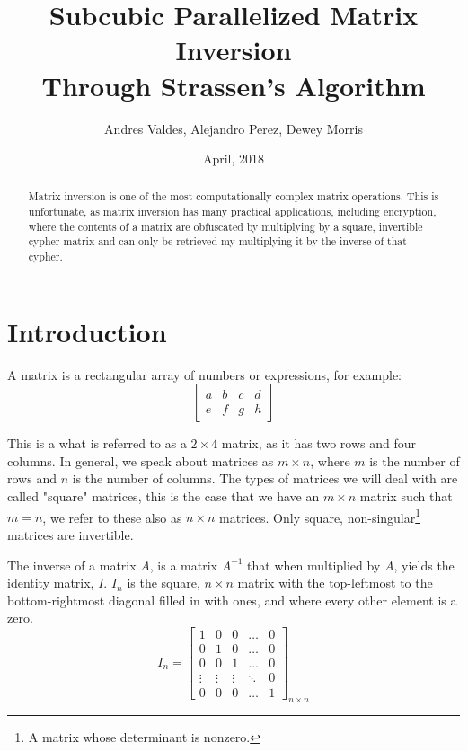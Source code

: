 \documentclass[12pt, letterpaper]{article}
\title{Subcubic Parallelized Matrix Inversion \\
	\large Through Strassen's Algorithm}
\author{Andres Valdes, Alejandro Perez, Dewey Morris}
\date{April, 2018}
\theoremstyle{remark}
\theoremstyle{remark}
\begin{document}
    \begin{titlepage}
        \maketitle
        \thispagestyle{empty}

    \end{titlepage}

    \begin{abstract}
        
        Matrix inversion is one of the most computationally complex 
        matrix operations. This is unfortunate, as matrix inversion 
        has many practical applications, including encryption, where the 
        contents of a matrix are obfuscated by multiplying by a square,
        invertible cypher matrix and can only be retrieved my multiplying
        it by the inverse of that cypher.

    \end{abstract}

    \pagebreak

    \section{Introduction}

    \noindent 
    A matrix is a rectangular array of numbers or expressions, for example: 
    \[\begin{bmatrix*}
        a & b & c & d \\
        e & f & g & h
    \end{bmatrix*}\]

    This is a what is referred to as a \(2\times{4}\) matrix, as it 
    has two rows and four columns. In general, we speak about matrices as 
    \(m\times{n}\), where \(m\) is the number of rows and \(n\) is the number 
    of columns. The types of matrices we will deal with are called "square" 
    matrices, this is the case that we have an \(m\times{n}\) matrix such that 
    \(m = n\), we refer to these also as \(n\times{n}\) matrices. Only square, 
    non-singular\footnote{A matrix whose determinant is nonzero.} 
    matrices are invertible.

    The inverse of a matrix \(A\), is a matrix \(A^{-1}\) that when multiplied by \(A\), 
    yields the identity matrix, \(I\). \(I_n\) is the square, \(n\times{n}\) 
    matrix with the top-leftmost to the bottom-rightmost diagonal filled in 
    with ones, and where every other element is a zero.
    \[I_n = \begin{bmatrix*}
        1 & 0 & 0 & \dots & 0 \\
        0 & 1 & 0 & \dots & 0 \\
        0 & 0 & 1 & \dots & 0 \\
        \vdots & \vdots & \vdots & \ddots & 0 \\
        0 & 0 & 0 & \dots & 1
    \end{bmatrix*}_{n\times n}\]
\end{document}
